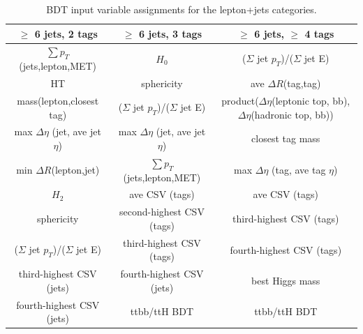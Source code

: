 \begin{table}
\begin{tabular}{ c | c | c |}
\hline
  \multicolumn{1}{|c|}{$\geq$ 6 jets, 2 tags}  				& $\geq$ 6 jets, 3 tags  			&  $\geq$ 6 jets, $\geq$ 4 tags \\
\hline
  \multicolumn{1}{|c|}{\(\sum p_{T}\)(jets,lepton,MET)}  		&  $H_{0}$  					&  (\(\Sigma\) jet \(p_{T}\))/(\(\Sigma\) jet E) \\
  \multicolumn{1}{|c|}{HT}  						&  sphericity					&  ave \(\Delta R\)(tag,tag) \\
  \multicolumn{1}{|c|}{mass(lepton,closest tag)} 			&  (\(\Sigma\) jet \(p_{T}\))/(\(\Sigma\) jet E)&  product(\(\Delta \eta\)(leptonic top, bb), \(\Delta \eta\)(hadronic top, bb)) \\
  \multicolumn{1}{|c|}{max \(\Delta \eta\) (jet, ave jet \(\eta\))}  	&  max \(\Delta \eta\) (jet, ave jet \(\eta\)) 	&  closest tag mass \\
  \multicolumn{1}{|c|}{min \(\Delta R\)(lepton,jet)} 			&  \(\sum p_{T}\)(jets,lepton,MET)  		&  max \(\Delta \eta\) (tag, ave tag \(\eta\)) \\
  \multicolumn{1}{|c|}{\(H_{2}\)} 					&  ave CSV (tags)  				&  ave CSV (tags) \\
  \multicolumn{1}{|c|}{sphericity} 					&  second-highest CSV (tags)			&  third-highest CSV (tags) \\
  \multicolumn{1}{|c|}{(\(\Sigma\) jet \(p_{T}\))/(\(\Sigma\) jet E)} 	&  third-highest CSV (tags) 			&  fourth-highest CSV (tags) \\
  \multicolumn{1}{|c|}{third-highest CSV (jets)} 			&  fourth-highest CSV (jets)  			&  best Higgs mass \\
  \multicolumn{1}{|c|}{fourth-highest CSV (jets)} 			&  ttbb/ttH BDT  				&  ttbb/ttH BDT \\

\hline
\end{tabular}
\caption{BDT input variable assignments for the lepton+jets categories.}
\label{tab:vars_by_category}
\end{table}



